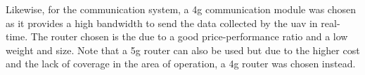 Likewise, for the communication system, a \gls{4g} communication module was chosen as it provides a high bandwidth to send the data collected by the \gls{uav} in real-time. The router chosen is the  due to a good price-performance ratio and a low weight and size. Note that a \gls{5g} router can also be used but due to the higher cost and the lack of coverage in the area of operation, a \gls{4g} router was chosen instead.

